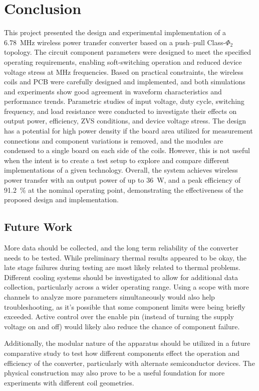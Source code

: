 \documentclass[journal, 9pt, letterpaper, english]{IEEEtran}[2015/08/26]
\begin{document}
\section{Conclusion}
This project presented the design and experimental implementation of a \qty{6.78}{\mega\hertz} wireless power transfer converter based on a push--pull Class-$\Phi_2$ topology.
The circuit component parameters were designed to meet the specified operating requirements, enabling soft-switching operation and reduced device voltage stress at MHz frequencies.
Based on practical constraints, the wireless coils and PCB were carefully designed and implemented, and both simulations and experiments show good agreement in waveform characteristics and performance trends.
Parametric studies of input voltage, duty cycle, switching frequency, and load resistance were conducted to investigate their effects on output power, efficiency, ZVS conditions, and device voltage stress.
The design has a potential for high power density if the board area utilized for measurement connections and component variations is removed, and the modules are condensed to a single board on each side of the coils.
However, this is not useful when the intent is to create a test setup to explore and compare different implementations of a given technology.
Overall, the system achieves wireless power transfer with an output power of up to \qty{36}{\watt}, and a peak efficiency of \qty{91.2}{\percent} at the nominal operating point, demonstrating the effectiveness of the proposed design and implementation.
\subsection{Future Work}
More data should be collected, and the long term reliability of the converter needs to be tested.
While preliminary thermal results appeared to be okay, the late stage failures during testing are most likely related to thermal problems.
Different cooling systems should be investigated to allow for additional data collection, particularly across a wider operating range.
Using a scope with more channels to analyze more parameters simultaneously would also help troubleshooting, as it's possible that some component limits were being briefly exceeded.
Active control over the enable pin (instead of turning the supply voltage on and off) would likely also reduce the chance of component failure.

Additionally, the modular nature of the apparatus should be utilized in a future comparative study to test how different components effect the operation and efficiency of the converter, particularly with alternate semiconductor devices.
The physical construction may also prove to be a useful foundation for more experiments with different coil geometries.
\end{document}
